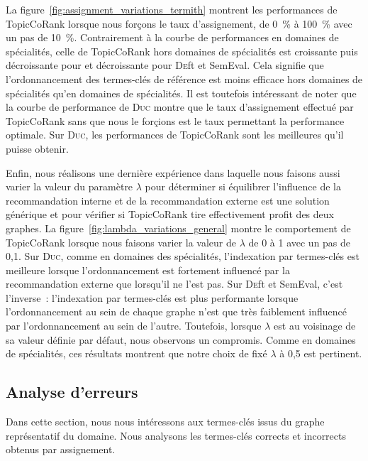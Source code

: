         La figure~\ref{fig:assignment_variations_termith} montrent les
        performances de TopicCoRank lorsque nous forçons le taux d'assignement,
        de 0~\% à 100~\% avec un pas de 10~\%. Contrairement à la courbe de
        performances en domaines de spécialités, celle de TopicCoRank hors
        domaines de spécialités est croissante puis décroissante pour 
        et décroissante pour \textsc{De}ft et SemEval. Cela signifie que
        l'ordonnancement des termes-clés de référence est moins efficace hors
        domaines de spécialités qu'en domaines de spécialités. Il est toutefois
        intéressant de noter que la courbe de performance de \textsc{Duc} montre
        que le taux d'assignement effectué par TopicCoRank sans que nous le
        forçions est le taux permettant la performance optimale. Sur
        \textsc{Duc}, les performances de TopicCoRank sont les meilleures qu'il
        puisse obtenir.
        

        Enfin, nous réalisons une dernière expérience dans laquelle nous faisons
        aussi varier la valeur du paramètre $\lambda$ pour déterminer si
        équilibrer l'influence de la recommandation interne et de la
        recommandation externe est une solution générique et pour vérifier si
        TopicCoRank tire effectivement profit des deux graphes. La
        figure~\ref{fig:lambda_variations_general}
        montre le comportement de TopicCoRank lorsque nous faisons varier la
        valeur de $\lambda$ de 0 à 1 avec un pas de 0,1. Sur \textsc{Duc}, comme
        en domaines des spécialités, l'indexation par termes-clés est meilleure
        lorsque l'ordonnancement est fortement influencé par la recommandation
        externe que lorsqu'il ne l'est pas. Sur \textsc{De}ft et SemEval, c'est
        l'inverse~: l'indexation par termes-clés est plus performante lorsque
        l'ordonnancement au sein de chaque graphe n'est que très faiblement
        influencé par l'ordonnancement au sein de l'autre. Toutefois, lorsque
        $\lambda$ est au voisinage de sa valeur définie par défaut, nous
        observons un compromis. Comme en domaines de spécialités, ces résultats
        montrent que notre choix de fixé $\lambda$ à 0,5 est pertinent.
        

    \subsection{Analyse d'erreurs}
    \label{subsec:main-domain_specific_keyphrase_annotation-supervised_automatic_keyphrase_annotation-error_analysis}
      Dans cette section, nous nous intéressons aux termes-clés issus du graphe
      représentatif du domaine. Nous analysons les termes-clés corrects et
      incorrects obtenus par assignement.\TODO{\dots}

